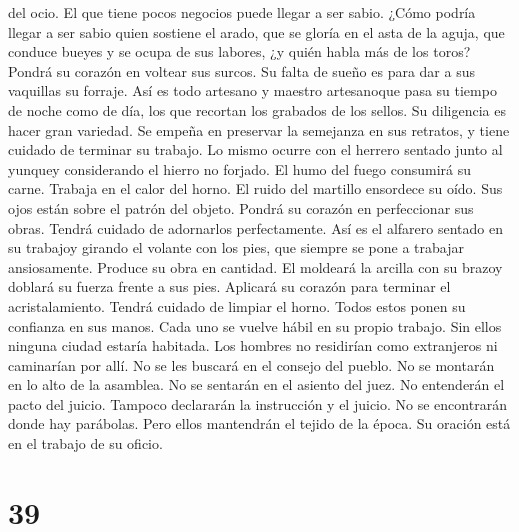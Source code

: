 del ocio. El que tiene pocos negocios puede llegar a ser sabio.
 ¿Cómo podría llegar a ser sabio quien sostiene el arado,
que se gloría en el asta de la aguja, que conduce bueyes y se ocupa de
sus labores, ¿y quién habla más de los toros?  Pondrá su
corazón en voltear sus surcos. Su falta de sueño es para dar a sus
vaquillas su forraje.  Así es todo artesano y maestro
artesanoque pasa su tiempo de noche como de día, los que recortan los
grabados de los sellos. Su diligencia es hacer gran variedad. Se empeña
en preservar la semejanza en sus retratos, y tiene cuidado de terminar
su trabajo.  Lo mismo ocurre con el herrero sentado junto
al yunquey considerando el hierro no forjado. El humo del fuego
consumirá su carne. Trabaja en el calor del horno. El ruido del martillo
ensordece su oído. Sus ojos están sobre el patrón del objeto. Pondrá su
corazón en perfeccionar sus obras. Tendrá cuidado de adornarlos
perfectamente.  Así es el alfarero sentado en su trabajoy
girando el volante con los pies, que siempre se pone a trabajar
ansiosamente. Produce su obra en cantidad.  El moldeará
la arcilla con su brazoy doblará su fuerza frente a sus pies. Aplicará
su corazón para terminar el acristalamiento. Tendrá cuidado de limpiar
el horno.  Todos estos ponen su confianza en sus manos.
Cada uno se vuelve hábil en su propio trabajo.  Sin ellos
ninguna ciudad estaría habitada. Los hombres no residirían como
extranjeros ni caminarían por allí.  No se les buscará en
el consejo del pueblo. No se montarán en lo alto de la asamblea. No se
sentarán en el asiento del juez. No entenderán el pacto del juicio.
Tampoco declararán la instrucción y el juicio. No se encontrarán donde
hay parábolas.  Pero ellos mantendrán el tejido de la
época. Su oración está en el trabajo de su oficio.

\hypertarget{section-38}{%
\section{39}\label{section-38}}

